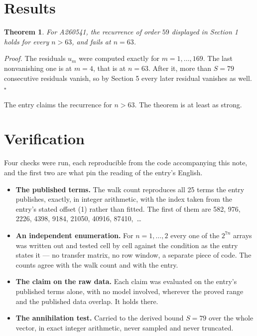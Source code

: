 \documentclass[11pt]{article}
\newtheorem{theorem}{Theorem}
\theoremstyle{definition}
\begin{document}
\section{Results}

\begin{theorem} For A260541, the recurrence of order $59$ displayed in Section 1 holds for every $n > 63$, and fails at $n = 63$.\end{theorem}

{\itshape Proof.} The residuals $u_m$ were computed exactly for $m = 1,\dots,169$. The last nonvanishing one is at $m = 4$, that is at $n = 63$. After it, more than $S = 79$ consecutive residuals vanish, so by Section 5 every later residual vanishes as well. $\square$

The entry claims the recurrence for $n > 63$. The theorem is at least as strong.

\section{Verification}

Four checks were run, each reproducible from the code accompanying this note, and the first two are what pin the reading of the entry's English.

\begin{itemize}

\item {\bfseries The published terms.} The walk count reproduces all 25 terms the entry publishes, exactly, in integer arithmetic, with the index taken from the entry's stated offset (1) rather than fitted. The first of them are 582, 976, 2226, 4398, 9184, 21050, 40916, 87410,~\dots

\item {\bfseries An independent enumeration.} For $n = 1,\dots,2$ every one of the $2^{7n}$ arrays was written out and tested cell by cell against the condition as the entry states it --- no transfer matrix, no row window, a separate piece of code. The counts agree with the walk count and with the entry.

\item {\bfseries The claim on the raw data.} Each claim was evaluated on the entry's published terms alone, with no model involved, wherever the proved range and the published data overlap. It holds there.

\item {\bfseries The annihilation test.} Carried to the derived bound $S = 79$ over the whole vector, in exact integer arithmetic, never sampled and never truncated.

\end{itemize}
\end{document}
